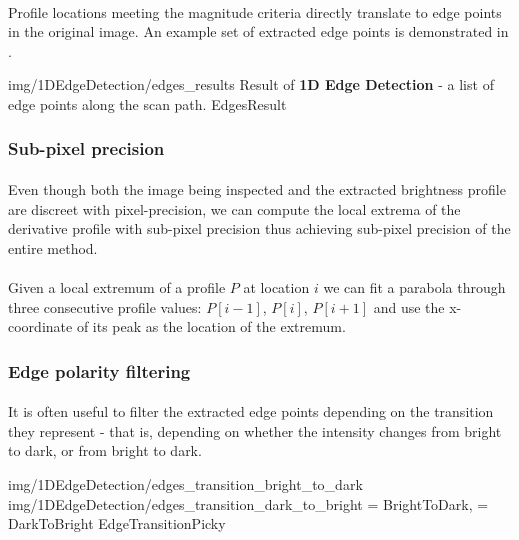 \paragraph*{}
Profile locations meeting the magnitude criteria directly translate to edge points in the original image. An example set of extracted edge points is demonstrated in .

\oneFigure
{img/1DEdgeDetection/edges_results}
{Result of \textbf{1D Edge Detection} - a list of edge points along the scan path.}
{EdgesResult}
{\basicWidth}

\subsubsection{Sub-pixel precision}

\paragraph*{}
Even though both the image being inspected and the extracted brightness profile are discreet with pixel-precision, we can compute the local extrema of the derivative profile with sub-pixel precision thus achieving sub-pixel precision of the entire method.

\paragraph*{}
Given a local extremum of a profile $P$ at location $i$ we can fit a parabola through three consecutive profile values: $P[i-1]$, $P[i]$, $P[i+1]$ and use the x-coordinate of its peak as the location of the extremum.

\subsubsection{Edge polarity filtering}
\paragraph*{}
It is often useful to filter the extracted edge points depending on the transition they represent - that is, depending on whether the intensity changes from bright to dark, or from bright to dark.

\twoFigures
{img/1DEdgeDetection/edges_transition_bright_to_dark}
{img/1DEdgeDetection/edges_transition_dark_to_bright}
{ = BrightToDark,  = DarkToBright}
{EdgeTransitionPicky}
{\basicWidth}

